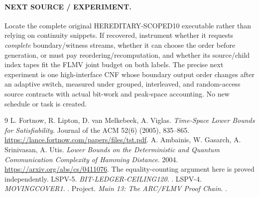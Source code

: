 \documentclass[11pt]{article}
\begin{document}
\paragraph{NEXT SOURCE / EXPERIMENT.}
Locate the complete original HEREDITARY-SCOPED10 executable rather than relying on continuity snippets. If recovered, instrument whether it requests \emph{complete} boundary/witness streams, whether it can choose the order before generation, or must pay reordering/recomputation, and whether its source/child index tapes fit the FLMV joint budget on both labels. The precise next experiment is one high-interface CNF whose boundary output order changes after an adaptive switch, measured under grouped, interleaved, and random-access source contracts with actual bit-work and peak-space accounting. No new schedule or task is created.

\begin{thebibliography}{9}
 L. Fortnow, R. Lipton, D. van Melkebeek, A. Viglas. \emph{Time-Space Lower Bounds for Satisfiability}. Journal of the ACM 52(6) (2005), 835--865. \url{https://lance.fortnow.com/papers/files/tst.pdf}.
 A. Ambainis, W. Gasarch, A. Srinivasan, A. Utis. \emph{Lower Bounds on the Deterministic and Quantum Communication Complexity of Hamming Distance}. 2004. \url{https://arxiv.org/abs/cs/0411076}. The equality-counting argument here is proved independently.
 LSPV-5. \emph{BIT-LEDGER-CEILING120}. .
 LSPV-4. \emph{MOVINGCOVER1}. .
 Project. \emph{Main 13: The ARC/FLMV Proof Chain}. .
\end{thebibliography}
\end{document}
